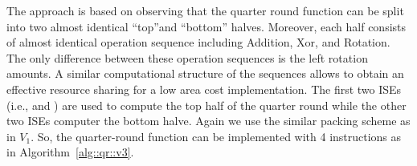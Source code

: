 \begin{itemize}




\end{itemize}

The approach is based on observing that the quarter round function can be split into two almost identical ``top''and ``bottom'' halves. 
Moreover, each half consists of almost identical operation sequence including Addition, Xor, and Rotation.
The only difference between these operation sequences is the left rotation amounts. 
A similar computational structure of the sequences allows to obtain an effective resource sharing for a low area cost implementation.
The first two ISEs (i.e.,  and ) are used to compute the top half of the quarter round while the other two ISEs computer the bottom halve.
Again we use the similar packing scheme as in $V_1$. So, the quarter-round function can be implemented with 4 instructions as in Algorithm~\ref{alg::qr::v3}.

